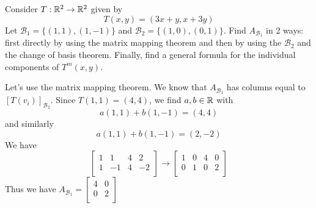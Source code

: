 \documentclass{article}
\begin{document}
\begin{example}
  Consider $T: \mathbb{R}^2 \to \mathbb{R}^2$ given by \[
    T(x, y) = (3x + y, x + 3y)
  \]
  Let $\mathcal{B}_1 = \{(1, 1), (1, -1)\}$ and $\mathcal{B}_2 = \{(1, 0), (0, 1)\}$. Find $A_{\mathcal{B}_1}$ in 2 ways: first directly by using the matrix mapping theorem and then by using the $\mathcal{B}_2$ and the change of basis theorem. Finally, find a general formula for the individual components of $T^m(x, y)$.

  Let's use the matrix mapping theorem. We know that $A_{\mathcal{B}_1}$ has columns equal to $[T(v_i)]_{\mathcal{B}_2}$. Since $T(1, 1) = (4, 4)$, we find $a, b \in \mathbb{R}$ with \[
    a(1, 1) + b(1, -1) = (4, 4)
  \] and similarly \[
    a(1, 1) + b(1, -1) = (2, -2)
  \]
  We have \[
    \left[
      \begin{array}{cc|cc}
        1 & 1 & 4 & 2\\
        1 & -1 & 4 & -2\\
    \end{array}\right] \to \left[
      \begin{array}{cc|cc}
        1 & 0 & 4 & 0\\
        0 & 1 & 0 & 2\\
    \end{array}\right]
  \]
  Thus we have $A_{\mathcal{B}_1} =
  \begin{bmatrix}
    4 & 0\\
    0 & 2\\
  \end{bmatrix}$


\end{example}
\end{document}
